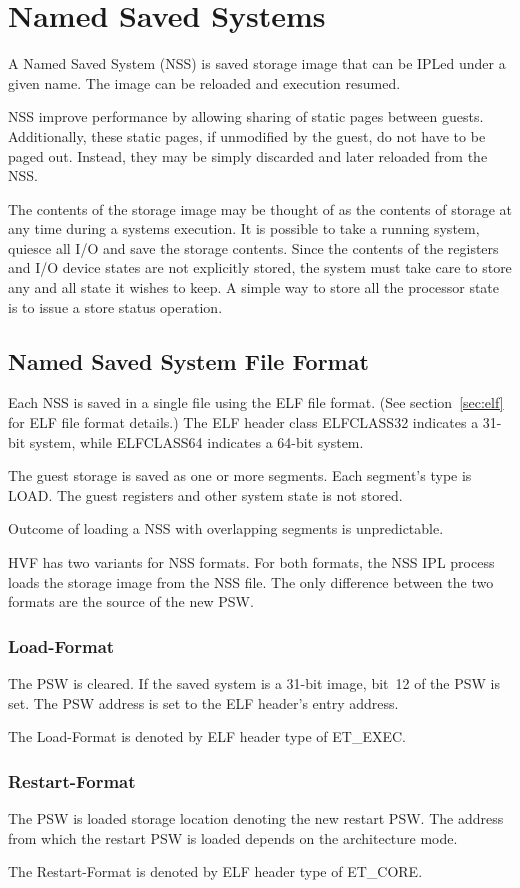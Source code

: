 \chapter{Named Saved Systems}
\label{chap:cp-nss}
\cbstart
A Named Saved System (NSS) is saved storage image that can be IPLed under a
given name.  The image can be reloaded and execution resumed.

NSS improve performance by allowing sharing of static pages between guests.
Additionally, these static pages, if unmodified by the guest, do not have to
be paged out.  Instead, they may be simply discarded and later reloaded from
the NSS.

The contents of the storage image may be thought of as the contents of
storage at any time during a systems execution.
%
It is possible to take a running system, quiesce all I/O and save the
storage contents.  Since the contents of the registers and I/O device states
are not explicitly stored, the system must take care to store any and all
state it wishes to keep.  A simple way to store all the processor state is
to issue a store status operation.

\section{Named Saved System File Format}
Each NSS is saved in a single file using the ELF file format.  (See
section~\ref{sec:elf} for ELF file format details.)  The ELF header class
ELFCLASS32 indicates a \mbox{31-bit} system, while ELFCLASS64 indicates a
\mbox{64-bit} system.

The guest storage is saved as one or more segments. Each segment's type is
LOAD.  The guest registers and other system state is not stored.

Outcome of loading a NSS with overlapping segments is unpredictable.

HVF has two variants for NSS formats.  For both formats, the NSS IPL process
loads the storage image from the NSS file.  The only difference between the
two formats are the source of the new PSW.

\subsection{Load-Format}
The PSW is cleared.  If the saved system is a \mbox{31-bit} image, bit~12 of
the PSW is set.  The PSW address is set to the ELF header's entry address.

The Load-Format is denoted by ELF header type of ET\_EXEC.

\subsection{Restart-Format}

The PSW is loaded storage location denoting the new restart PSW.  The
address from which the restart PSW is loaded depends on the architecture
mode.

The Restart-Format is denoted by ELF header type of ET\_CORE.
\cbend
